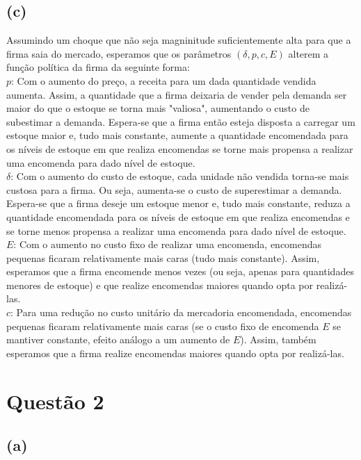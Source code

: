\documentclass{article}
\begin{document}
\subsection*{(c)}

Assumindo um choque que não seja magninitude suficientemente alta para que a firma saia do mercado, esperamos que os parâmetros $(\delta, p, c, E)$ alterem a função política da firma da seguinte forma:\\[4pt]

$p$: Com o aumento do preço, a receita para um dada quantidade vendida aumenta. Assim, a quantidade que a firma deixaria de vender pela demanda ser maior do que o estoque se torna mais "valiosa", aumentando o custo de subestimar a demanda. Espera-se que a firma então esteja disposta a carregar um estoque maior e, tudo mais constante, aumente a quantidade encomendada para os níveis de estoque em que realiza encomendas se torne mais propensa a realizar uma encomenda para dado nível de estoque.\\[4pt]

$\delta$: Com o aumento do custo de estoque, cada unidade não vendida torna-se mais custosa para a firma. Ou seja, aumenta-se o custo de superestimar a demanda. Espera-se que a firma deseje um estoque menor e, tudo mais constante, reduza a quantidade encomendada para os níveis de estoque em que realiza encomendas e se torne menos propensa a realizar uma encomenda para dado nível de estoque.\\[4pt]

$E$: Com o aumento no custo fixo de realizar uma encomenda, encomendas pequenas ficaram relativamente mais caras (tudo mais constante). Assim, esperamos que a firma encomende menos vezes (ou seja, apenas para quantidades menores de estoque) e que realize encomendas maiores quando opta por realizá-las. \\[4pt]

$c$: Para uma redução no custo unitário da mercadoria encomendada, encomendas pequenas ficaram relativamente mais caras (se o custo fixo de encomenda $E$ se mantiver constante, efeito análogo a um aumento de $E$). Assim, também esperamos que a firma realize encomendas maiores quando opta por realizá-las.

\section*{Questão 2}

\subsection*{(a)}\label{2a}
\end{document}
